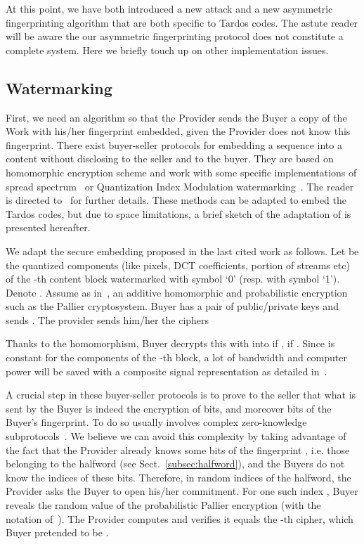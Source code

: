 \documentclass{article}
\begin{document}
At this point, we have both introduced a new attack and a new
asymmetric fingerprinting algorithm that are both specific to
Tardos codes.  The astute reader will be aware the our asymmetric
fingerprinting protocol does not constitute a complete system.  Here
we briefly touch up on other implementation issues. 

\subsection{Watermarking}
\label{sec:Embed}

First, we need an algorithm so that the
Provider sends the Buyer a copy of the Work with his/her fingerprint embedded,
given the Provider does not know this fingerprint.
There exist buyer-seller
protocols for embedding a sequence  into a content
 without disclosing  to the seller and 
to the buyer. They are based on homomorphic encryption scheme and work
with some specific implementations of spread
spectrum~\cite{Kuri08Spread} or Quantization Index Modulation
watermarking~\cite{Deng:2009fk}.  The reader is directed to~\cite{Kuri08Spread,Deng:2009fk} for further details.  These methods
can be adapted to embed the Tardos codes, but due to space limitations,
a brief sketch of the adaptation of \cite{Deng:2009fk} is presented hereafter.

 We adapt the secure embedding proposed in the last cited work as
 follows. Let 
 be the  quantized components (like pixels, DCT coefficients, portion of streams etc) of the -th content block watermarked with symbol `0'
 (resp.  with symbol `1'). Denote . Assume as
 in~\cite[Sect. 5]{Deng:2009fk}, an additive homomorphic and
 probabilistic encryption  such as the Pallier cryptosystem. Buyer
  has a pair of public/private keys  and sends
 . The provider sends
 him/her the ciphers
 
 Thanks to the homomorphism, Buyer  decrypts this with  into
  if ,  if .
 Since  is constant for the  components of the -th
 block, a lot of bandwidth and computer power will be saved with a
 composite signal representation as detailed
 in~\cite[Sect. 3.2.2]{Deng:2009fk}.




A crucial step in these buyer-seller protocols is to prove to the
seller that what is sent by the Buyer is indeed the encryption of bits,
and moreover bits of the Buyer's fingerprint.  To do so usually
involves complex zero-knowledge subprotocols~\cite{Kuri08Spread,Deng:2009fk}.
We believe we can avoid
this complexity by taking advantage of the fact that
the Provider already knows some bits of the fingerprint
, i.e. those
belonging to the halfword (see
Sect.~\ref{subsec:halfword}), and the Buyers do not know the indices of these bits. Therefore, in  random indices of
the halfword, the Provider asks the Buyer  to open his/her
commitment. For one such index , Buyer  reveals the random
value  of the probabilistic Pallier encryption (with the notation of~\cite{Deng:2009fk}). The Provider
computes  and verifies it equals the
-th cipher, which Buyer  pretended to be
. 
\end{document}
